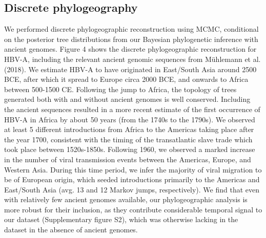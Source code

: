 \subsection{Discrete phylogeography}
We performed discrete phylogeographic reconstruction using MCMC, conditional on the posterior tree distributions from our Bayesian phylogenetic inference with ancient genomes. Figure 4 shows the discrete phylogeographic reconstruction for HBV-A, including the relevant ancient genomic sequences from Mühlemann et al. (2018). We estimate HBV-A to have originated in East/South Asia around 2500 BCE, after which it spread to Europe circa 2000 BCE, and onwards to Africa between 500-1500 CE. Following the jump to Africa, the topology of trees generated both with and without ancient genomes is well conserved. Including the ancient sequences resulted in a more recent estimate of the first occurrence of HBV-A in Africa by about 50 years (from the 1740s to the 1790s). We observed at least 5 different introductions from Africa to the Americas taking place after the year 1700, consistent with the timing of the transatlantic slave trade which took place between 1520s-1850s. Following 1960, we observed a marked increase in the number of viral transmission events between the Americas, Europe, and Western Asia. During this time period, we infer the majority of viral migration to be of European origin, which seeded introductions primarily to the Americas and East/South Asia (avg. 13 and 12 Markov jumps, respectively). We find that even with relatively few ancient genomes available, our phylogeographic analysis is more robust for their inclusion, as they contribute considerable temporal signal to our dataset (Supplementary figure S2), which was otherwise lacking in the dataset in the absence of ancient genomes. 


